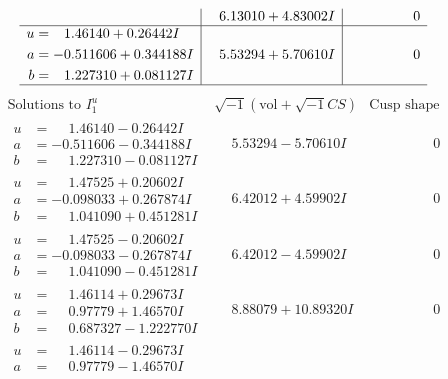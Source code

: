 \documentclass[1p]{elsarticle_modified}
\theoremstyle{definition}
\newcommand{\I}{\sqrt{-1}}
\begin{document}
$$\begin{array}{c|c|c}
 & \phantom{-}6.13010 + 4.83002 I & \phantom{-0.000000 } 0 \\ \hline\begin{aligned}
u &= \phantom{-}1.46140 + 0.26442 I \\
a &= -0.511606 + 0.344188 I \\
b &= \phantom{-}1.227310 + 0.081127 I\end{aligned}
 & \phantom{-}5.53294 + 5.70610 I & \phantom{-0.000000 } 0\\
 \hline 
 \end{array}$$\newpage$$\begin{array}{c|c|c}  
\text{Solutions to }I^u_{1}& \I (\text{vol} + \sqrt{-1}CS) & \text{Cusp shape}\\
 \hline 
\begin{aligned}
u &= \phantom{-}1.46140 - 0.26442 I \\
a &= -0.511606 - 0.344188 I \\
b &= \phantom{-}1.227310 - 0.081127 I\end{aligned}
 & \phantom{-}5.53294 - 5.70610 I & \phantom{-0.000000 } 0 \\ \hline\begin{aligned}
u &= \phantom{-}1.47525 + 0.20602 I \\
a &= -0.098033 + 0.267874 I \\
b &= \phantom{-}1.041090 + 0.451281 I\end{aligned}
 & \phantom{-}6.42012 + 4.59902 I & \phantom{-0.000000 } 0 \\ \hline\begin{aligned}
u &= \phantom{-}1.47525 - 0.20602 I \\
a &= -0.098033 - 0.267874 I \\
b &= \phantom{-}1.041090 - 0.451281 I\end{aligned}
 & \phantom{-}6.42012 - 4.59902 I & \phantom{-0.000000 } 0 \\ \hline\begin{aligned}
u &= \phantom{-}1.46114 + 0.29673 I \\
a &= \phantom{-}0.97779 + 1.46570 I \\
b &= \phantom{-}0.687327 - 1.222770 I\end{aligned}
 & \phantom{-}8.88079 + 10.89320 I & \phantom{-0.000000 } 0 \\ \hline\begin{aligned}
u &= \phantom{-}1.46114 - 0.29673 I \\
a &= \phantom{-}0.97779 - 1.46570 I \\

\end{aligned}
\end{array}$$
\end{document}
